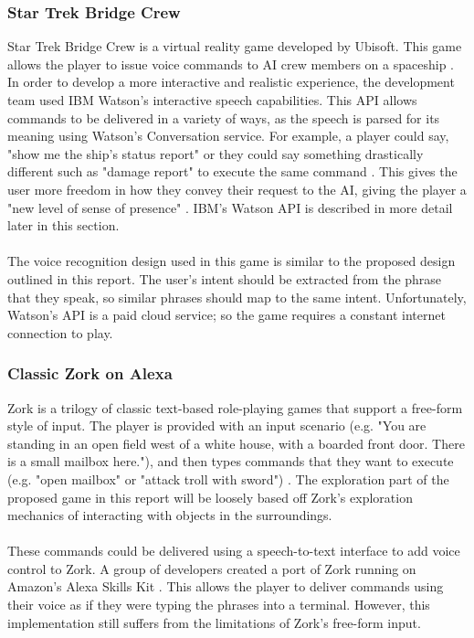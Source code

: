 \documentclass[12pt]{article}
\begin{document}
\subsubsection{Star Trek Bridge Crew}

Star Trek Bridge Crew is a virtual reality game developed by Ubisoft. This game allows the player to issue voice commands to AI crew members on a spaceship \cite{RefWorks:29}. In order to develop a more interactive and realistic experience, the development team used IBM Watson's interactive speech capabilities. This API allows commands to be delivered in a variety of ways, as the speech is parsed for its meaning using Watson's Conversation service. For example, a player could say, "show me the ship's status report" or they could say something drastically different such as "damage report" to execute the same command \cite{RefWorks:25}. This gives the user more freedom in how they convey their request to the AI, giving the player a "new level of sense of presence" \cite{RefWorks:26}. IBM's Watson API is described in more detail later in this section.
\\
\\
The voice recognition design used in this game is similar to the proposed design outlined in this report. The user's intent should be extracted from the phrase that they speak, so similar phrases should map to the same intent. Unfortunately, Watson's API is a paid cloud service; so the game requires a constant internet connection to play.

\subsubsection{Classic Zork on Alexa}

Zork is a trilogy of classic text-based role-playing games that support a free-form style of input. The player is provided with an input scenario (e.g. "You are standing in an open field west of a white house, with a boarded front door. There is a small mailbox here."), and then types commands that they want to execute (e.g. "open mailbox" or "attack troll with sword") \cite{RefWorks:35}. The exploration part of the proposed game in this report will be loosely based off Zork's exploration mechanics of interacting with objects in the surroundings.
\\
\\
These commands could be delivered using a speech-to-text interface to add voice control to Zork. A group of developers created a port of Zork running on Amazon's Alexa Skills Kit \cite{RefWorks:37}. This allows the player to deliver commands using their voice as if they were typing the phrases into a terminal. However, this implementation still suffers from the limitations of Zork's free-form input.
\end{document}
